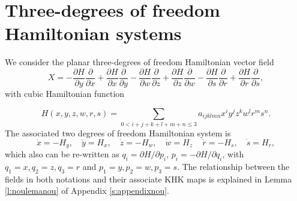 \documentclass[11pt]{article}
\begin{document}
\section{Three-degrees of freedom Hamiltonian systems}\label{s:r6}

We consider the planar three-degrees of freedom Hamiltonian vector field
$$
X=-\frac{\partial H}{\partial y} \frac{\partial}{\partial x}+\frac{\partial H}{\partial x}\frac{\partial}{\partial y}
-\frac{\partial H}{\partial w} \frac{\partial}{\partial z}+\frac{\partial H}{\partial z}\frac{\partial}{\partial w}-\frac{\partial H}{\partial s} \frac{\partial}{\partial r}+\frac{\partial H}{\partial r}\frac{\partial}{\partial s},
$$
with cubic Hamiltonian function

 \begin{equation}\label{e:genham6}
H(x,y,z,w,r,s)=\displaystyle{
\sum\limits_{0< i+j+k+l+m+n\leq 3}} a_{ijklmn}x^iy^jz^kw^lr^ms^n.
 \end{equation}
 The associated two degrees of freedom Hamiltonian system is
\begin{equation}\label{e:ham6}
 \dot{x}=-H_y, \quad
\dot{y}=H_x,\quad
\dot{z}=-H_w, \quad
\dot{w}=H_z\, \quad
\dot{r}=-H_s, \quad
\dot{s}=H_r,
\end{equation}
which also can be re-written as $q_i=\partial H/\partial p_i$, $p_i=-\partial H/\partial q_i$, with $q_1=x,q_2=z,q_3=r$ and $p_1=y,p_2=w,p_3=s$.
The relationship between the fields in both notations and their associate KHK maps is explained in Lemma \ref{l:noulemanou} of Appendix \ref{s:appendixnou}.
\end{document}
